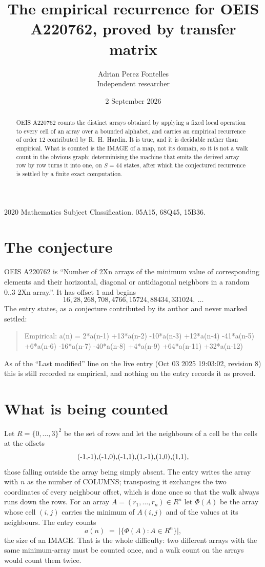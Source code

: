 \documentclass[11pt,a4paper]{article}
\title{The empirical recurrence for OEIS A220762, proved by transfer matrix}
\author{Adrian Perez Fontelles\\ \small Independent researcher}
\date{2 September 2026}
\theoremstyle{plain}
\theoremstyle{definition}
\begin{document}
\maketitle

\begin{abstract}
OEIS A220762 counts the distinct arrays obtained by applying a fixed local operation to every cell
of an array over a bounded alphabet, and carries an empirical recurrence of order $12$
contributed by R.~H.~Hardin. It is true, and it is decidable rather than empirical. What is
counted is the IMAGE of a map, not its domain, so it is not a walk count in the obvious graph;
determinising the machine that emits the derived array row by row turns it into one, on
$S=44$ states, after which the conjectured recurrence is settled by a finite exact
computation.
\end{abstract}

\noindent\small 2020 Mathematics Subject Classification. 05A15, 68Q45, 15B36.\normalsize

\section{The conjecture}

OEIS A220762 is ``Number of 2Xn arrays of the minimum value of corresponding elements and their horizontal, diagonal or antidiagonal neighbors in a random 0..3 2Xn array.''. It has offset $1$ and begins
\[
16, 28, 268, 708, 4766, 15724, 88434, 331024,\ \dots
\]
The entry states, as a conjecture contributed by its author and never marked settled:
\begin{quote}
Empirical: a(n) = 2*a(n-1) +13*a(n-2) -10*a(n-3) +12*a(n-4) -41*a(n-5) +6*a(n-6) -16*a(n-7) -40*a(n-8) +4*a(n-9) +64*a(n-11) +32*a(n-12)
\end{quote}
As of the ``Last modified'' line on the live entry (Oct 03 2025 19:03:02, revision 8) this is still
recorded as empirical, and nothing on the entry records it as proved.

\section{What is being counted}

Let $R=\{0,\dots,3\}^{2}$ be the set of rows and let the neighbours of
a cell be the cells at the offsets
\[
$(-1,-1)$, $(-1,0)$, $(-1,1)$, $(1,-1)$, $(1,0)$, $(1,1)$,
\]
those falling outside the array being simply absent. The entry writes the array with $n$ as the number of COLUMNS; transposing it exchanges the two coordinates of every neighbour offset, which is done once so that the walk always runs down the rows. For an array
$A=(r_1,\dots,r_n)\in R^n$ let $\Phi(A)$ be the array whose cell $(i,j)$ carries the
minimum of $A(i,j)$ and of the values at its neighbours. The entry counts
\[
a(n)\;=\;\bigl|\{\Phi(A):A\in R^n\}\bigr| ,
\]
the size of an IMAGE. That is the whole difficulty: two different arrays with the same
minimum-array must be counted once, and a walk count on the arrays would count them twice.
\end{document}
